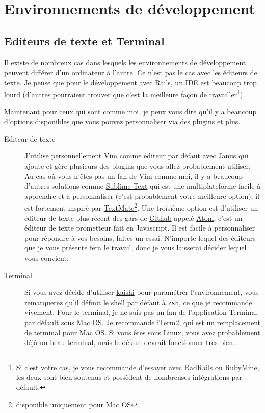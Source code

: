 \documentclass[]{report}
\begin{document}
  \section{Environnements de développement}

    \subsection{Editeurs de texte et Terminal}

      Il existe de nombreux cas dans lesquels les environnements de développement peuvent différer d'un ordinateur à l'autre. Ce n'est pas le cas avec les éditeurs de texte. Je pense que pour le développement avec Rails, un IDE est beaucoup trop lourd (d'autres pourraient trouver que c'est la meilleure façon de travailler\footnote{Si c'est votre cas, je vous recommande d'essayer avec \href{http://www.aptana.com/products/radrails}{RadRails} ou \href{http://www.jetbrains.com/ruby/index.html}{RubyMine}, les deux sont bien soutenus et possèdent de nombreuses intégrations par défault.}).

      Maintenant pour ceux qui sont comme moi, je peux vous dire qu'il y a beaucoup d'options disponibles que vous pouvez personnaliser via des plugins et plus.

      \begin{description}
        \item[Editeur de texte] J'utilise personnellement \href{http://www.vim.org/}{Vim} comme éditeur par défaut avec \href{https://github.com/carlhuda/janus}{Janus} qui ajoute et gère plusieurs des plugins que vous allez probablement utiliser. Au cas où vous n'êtes pas un fan de Vim comme moi, il y a beaucoup d'autres solutions comme \href{http://www.sublimetext.com/}{Sublime Text} qui est une multiplateforme facile à apprendre et à personnaliser (c'est probablement votre meilleure option), il est fortement inspiré par \href{http://macromates.com/}{TextMate}\footnote{disponible uniquement pour Mac OS}. Une troisième option est d'utiliser un éditeur de texte plus récent des gars de \href{http://gitub.com/}{Github} appelé \href{https://atom.io/}{Atom}, c'est un éditeur de texte prometteur fait en Javascript. Il est facile à personnaliser pour répondre à vos besoins, faites un essai. N'importe lequel des éditeurs que je vous présente fera le travail, donc je vous laisserai décider lequel vous convient.

        \item[Terminal] Si vous avez décidé d'utiliser \href{http://icalialabs.github.io/kaishi/}{kaishi} pour paramétrer l'environnement, vous remarquerez qu'il définit le shell par défaut à \verb|zsh|, ce que je recommande vivement. Pour le terminal, je ne suis pas un fan de l'application Terminal par défault sous Mac OS. Je recommande \href{http://www.iterm2.com/#/section/home}{iTerm2}, qui est un remplacement de terminal pour Mac OS. Si vous êtes sous Linux, vous avez probablement déjà un beau terminal, mais le défaut devrait fonctionner très bien.
      \end{description}
\end{document}
